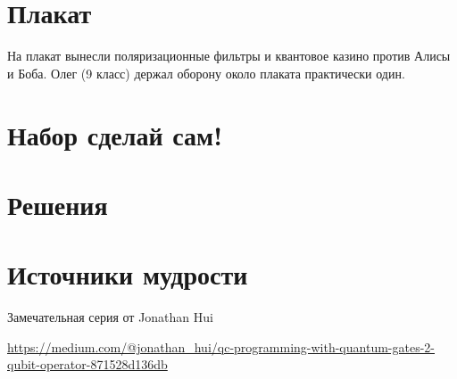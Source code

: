 \documentclass[12pt]{article}
\newcounter{problem}[section]
\theoremstyle{definition}
\begin{document}
\section{Плакат}

На плакат вынесли поляризационные фильтры и квантовое казино против Алисы и Боба.
Олег (9 класс) держал оборону около плаката практически один. 




\renewenvironment{solution}[1]{%
         \vskip .5cm plus 2cm minus 0.1cm%
         {\bfseries \hyperlink{problem:#1}{#1.}}%
}%
{%
}%

\section{Набор сделай сам!}

\cite{stay2014deutch}

\section{Решения}



\section{Источники мудрости}

Замечательная серия от Jonathan Hui

\url{https://medium.com/@jonathan_hui/qc-programming-with-quantum-gates-2-qubit-operator-871528d136db}

\printbibliography[heading=none]
\end{document}
